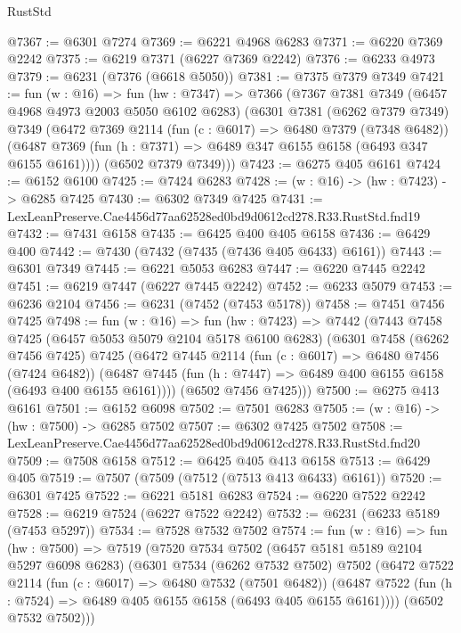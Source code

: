 \begin{lexlean}{RustStd}
\begin{coremodule}
@7367 := @6301 @7274
@7369 := @6221 @4968 @6283
@7371 := @6220 @7369 @2242
@7375 := @6219 @7371 (@6227 @7369 @2242)
@7376 := @6233 @4973
@7379 := @6231 (@7376 (@6618 @5050))
@7381 := @7375 @7379 @7349
@7421 := fun (w : @16) =>
  fun (hw : @7347) =>
  @7366
    (@7367
      @7381
      @7349
      (@6457 @4968 @4973 @2003 @5050 @6102 @6283)
      (@6301
        @7381
        (@6262 @7379 @7349)
        @7349
        (@6472
          @7369
          @2114
          (fun (c : @6017) => @6480 @7379 (@7348 @6482))
          (@6487 @7369 (fun (h : @7371) => @6489 @347 @6155 @6158 (@6493 @347 @6155 @6161))))
        (@6502 @7379 @7349)))
@7423 := @6275 @405 @6161
@7424 := @6152 @6100
@7425 := @7424 @6283
@7428 := (w : @16) -> (hw : @7423) -> @6285 @7425
@7430 := @6302 @7349 @7425
@7431 := LexLeanPreserve.Cae4456d77aa62528ed0bd9d0612cd278.R33.RustStd.fnd19
@7432 := @7431 @6158
@7435 := @6425 @400 @405 @6158
@7436 := @6429 @400
@7442 := @7430 (@7432 (@7435 (@7436 @405 @6433) @6161))
@7443 := @6301 @7349
@7445 := @6221 @5053 @6283
@7447 := @6220 @7445 @2242
@7451 := @6219 @7447 (@6227 @7445 @2242)
@7452 := @6233 @5079
@7453 := @6236 @2104
@7456 := @6231 (@7452 (@7453 @5178))
@7458 := @7451 @7456 @7425
@7498 := fun (w : @16) =>
  fun (hw : @7423) =>
  @7442
    (@7443
      @7458
      @7425
      (@6457 @5053 @5079 @2104 @5178 @6100 @6283)
      (@6301
        @7458
        (@6262 @7456 @7425)
        @7425
        (@6472
          @7445
          @2114
          (fun (c : @6017) => @6480 @7456 (@7424 @6482))
          (@6487 @7445 (fun (h : @7447) => @6489 @400 @6155 @6158 (@6493 @400 @6155 @6161))))
        (@6502 @7456 @7425)))
@7500 := @6275 @413 @6161
@7501 := @6152 @6098
@7502 := @7501 @6283
@7505 := (w : @16) -> (hw : @7500) -> @6285 @7502
@7507 := @6302 @7425 @7502
@7508 := LexLeanPreserve.Cae4456d77aa62528ed0bd9d0612cd278.R33.RustStd.fnd20
@7509 := @7508 @6158
@7512 := @6425 @405 @413 @6158
@7513 := @6429 @405
@7519 := @7507 (@7509 (@7512 (@7513 @413 @6433) @6161))
@7520 := @6301 @7425
@7522 := @6221 @5181 @6283
@7524 := @6220 @7522 @2242
@7528 := @6219 @7524 (@6227 @7522 @2242)
@7532 := @6231 (@6233 @5189 (@7453 @5297))
@7534 := @7528 @7532 @7502
@7574 := fun (w : @16) =>
  fun (hw : @7500) =>
  @7519
    (@7520
      @7534
      @7502
      (@6457 @5181 @5189 @2104 @5297 @6098 @6283)
      (@6301
        @7534
        (@6262 @7532 @7502)
        @7502
        (@6472
          @7522
          @2114
          (fun (c : @6017) => @6480 @7532 (@7501 @6482))
          (@6487 @7522 (fun (h : @7524) => @6489 @405 @6155 @6158 (@6493 @405 @6155 @6161))))
        (@6502 @7532 @7502)))

\end{coremodule}
\end{lexlean}
